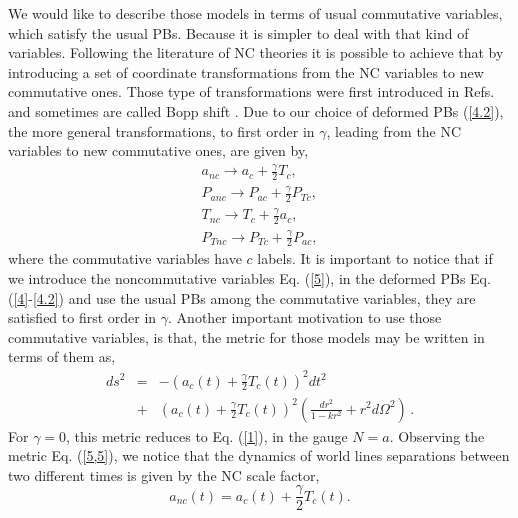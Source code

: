\documentclass[12pt]{article}
\newcommand{\ea}{\end{eqnarray}}
\newcommand{\ba}{\begin{eqnarray}}
\newcommand{\0}{{(0)}}
\newcommand{\1}{{(1)}}
\newcommand{\2}{{(2)}}
\begin{document}
We would like to describe those models in terms of usual commutative variables, which satisfy the usual PBs.
Because it is simpler to deal with that kind of variables.
Following the literature of NC theories it is possible to achieve that by introducing a set of 
coordinate transformations from the NC variables to new commutative ones. Those type of 
transformations were first introduced in Refs. \cite{susskind} and sometimes are called Bopp shift \cite{zachos}.
Due to our choice of deformed PBs (\ref{4.2}), the more general transformations, to first order in $\gamma$, leading
from the NC variables to new commutative ones, are given by,
\ba
\label{5}
a_{nc}\rightarrow a_c + \frac{\gamma}{2}T_c,\nonumber\\
P_{anc}\rightarrow P_{ac} + \frac{\gamma}{2}P_{Tc},\nonumber\\
T_{nc}\rightarrow T_c + \frac{\gamma}{2}a_c,\\
P_{Tnc}\rightarrow P_{Tc} + \frac{\gamma}{2}P_{ac},\nonumber
\ea
where the commutative variables have $c$ labels. It is important to notice that
if we introduce the noncommutative variables Eq. (\ref{5}), in the deformed PBs Eq. (\ref{4}-\ref{4.2}) 
and use the usual PBs among the commutative variables, they are satisfied to first 
order in $\gamma$. Another important motivation to use those commutative variables, is that, the metric for those models
may be written in terms of them as,
\begin{eqnarray}  
\label{5,5}
ds^2 & = & - \left(a_c(t) + \frac{\gamma}{2}T_c(t)\right)^2 dt^2 \nonumber\\
& + & \left(a_c(t) + \frac{\gamma}{2}T_c(t)\right)^2\left( \frac{dr^2}{1 - kr^2} + r^2 d\Omega^2\right)\, .
\end{eqnarray}
For $\gamma = 0$, this metric reduces to Eq. (\ref{1}), in the gauge $N = a$. Observing the metric Eq. (\ref{5,5}), we notice that the dynamics of
world lines separations between two different times is given by the NC scale factor,
\begin{equation}
\label{5,55}
a_{nc}(t) = a_c(t) + \frac{\gamma}{2}T_c(t).
\end{equation}
\end{document}
